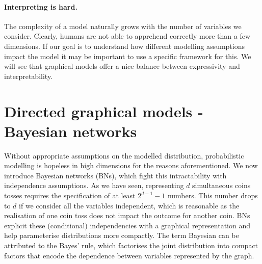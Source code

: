 \paragraph{Interpreting is hard.} The complexity of a model naturally grows with the number of variables we consider. Clearly, humans are not able to apprehend correctly more than a few dimensions. If our goal is to understand how different modelling assumptions impact the model it may be important to use a specific framework for this. We will see that graphical models offer a nice balance between expressivity and interpretability.

\section{Directed graphical models - Bayesian networks}
Without appropriate assumptions on the modelled distribution, probabilistic modelling is hopeless in high dimensions for the reasons aforementioned. We now introduce Bayesian networks (BNs), which fight this intractability with independence assumptions. As we have seen, representing $d$ simultaneous coins tosses requires the specification of at least $2^{d-1} - 1$ numbers. This number drops to $d$ if we consider all the variables independent, which is reasonable as the realisation of one coin toss does not impact the outcome for another coin. BNs explicit these (conditional) independencies with a graphical representation and help parameterise distributions more compactly. The term Bayesian can be attributed to the Bayes' rule, which factorises the joint distribution into compact factors that encode the dependence between variables represented by the graph.

